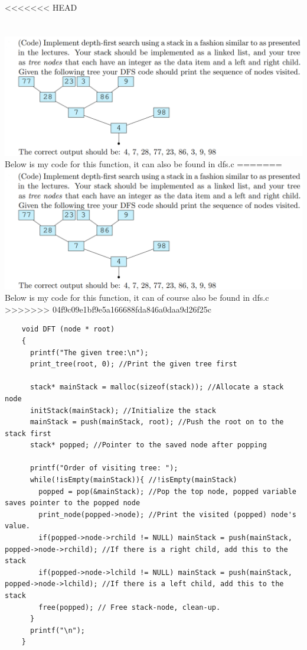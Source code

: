 \documentclass{article}
\begin{document}
\pagebreak
<<<<<<< HEAD
\section{}
\includegraphics[width=\linewidth, keepaspectratio=true]{task4}
Below is my code for this function, it can also be found in dfs.c
=======
\includegraphics[width=\linewidth, keepaspectratio=true]{task4}
Below is my code for this function, it can of course also be found in dfs.c
>>>>>>> 04f9c09e1bf9e5a166688fda846a0daa9d26f25c
\begin{lstlisting}
    void DFT (node * root)
    {
      printf("The given tree:\n");
      print_tree(root, 0); //Print the given tree first
    
      stack* mainStack = malloc(sizeof(stack)); //Allocate a stack node
      initStack(mainStack); //Initialize the stack
      mainStack = push(mainStack, root); //Push the root on to the stack first
      stack* popped; //Pointer to the saved node after popping
    
      printf("Order of visiting tree: ");
      while(!isEmpty(mainStack)){ //!isEmpty(mainStack)
        popped = pop(&mainStack); //Pop the top node, popped variable saves pointer to the popped node
        print_node(popped->node); //Print the visited (popped) node's value.
        if(popped->node->rchild != NULL) mainStack = push(mainStack, popped->node->rchild); //If there is a right child, add this to the stack
        if(popped->node->lchild != NULL) mainStack = push(mainStack, popped->node->lchild); //If there is a left child, add this to the stack
        free(popped); // Free stack-node, clean-up.
      }
      printf("\n");
    }
\end{lstlisting}


\vspace{2pt}
\end{document}
